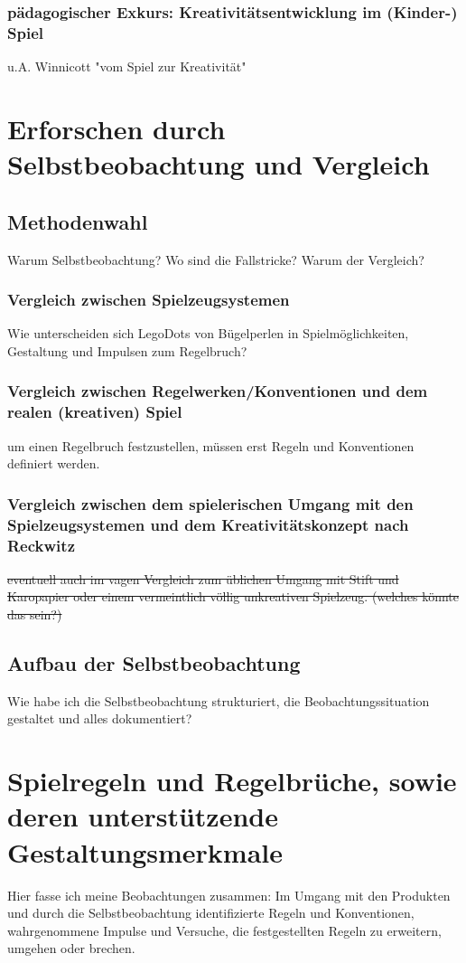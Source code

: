 \documentclass[11pt,a4paper,twoside]{scrreprt}
\begin{document}
		\subsection{pädagogischer Exkurs: Kreativitätsentwicklung im (Kinder-) Spiel}
		u.A. Winnicott "vom Spiel zur Kreativität"



\chapter{Erforschen durch Selbstbeobachtung und Vergleich}
	\section{Methodenwahl}
	Warum Selbstbeobachtung? Wo sind die Fallstricke? Warum der Vergleich? 
		\subsection{Vergleich zwischen Spielzeugsystemen}
		Wie unterscheiden sich LegoDots von Bügelperlen in Spielmöglichkeiten, Gestaltung und Impulsen zum Regelbruch?
		\subsection{Vergleich zwischen Regelwerken/Konventionen und dem realen (kreativen) Spiel}
		um einen Regelbruch festzustellen, müssen erst Regeln und Konventionen definiert werden.
		\subsection{Vergleich zwischen dem spielerischen Umgang mit den Spielzeugsystemen und dem Kreativitätskonzept nach Reckwitz}
		\sout{eventuell auch im vagen Vergleich zum üblichen Umgang mit Stift und Karopapier oder einem vermeintlich völlig unkreativen Spielzeug. (welches könnte das sein?)}
	\section{Aufbau der Selbstbeobachtung}
Wie habe ich die Selbstbeobachtung strukturiert, die Beobachtungssituation gestaltet und alles dokumentiert?


\chapter{Spielregeln und Regelbrüche, sowie deren unterstützende Gestaltungsmerkmale}
Hier fasse ich meine Beobachtungen zusammen: Im Umgang mit den Produkten und durch die Selbstbeobachtung identifizierte Regeln und Konventionen, wahrgenommene Impulse und Versuche, die festgestellten Regeln zu erweitern, umgehen oder brechen.
\end{document}
